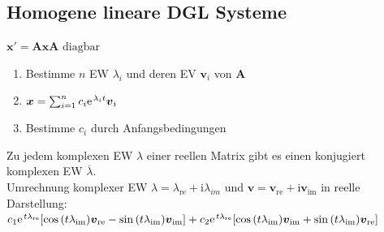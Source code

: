 \documentclass[6pt,a4paper]{scrartcl}
\let\olddot = \dot
\newcommand{\mat}[1]{\ensuremath{\begin{bmatrix} #1 \end{bmatrix}}}								%
\newcommand{\ma}[1]{\ensuremath{\boldsymbol {#1}}}												%
\newcommand{\vect}[1]{\ensuremath{\begin{pmatrix} #1 \end{pmatrix}}}							%
\newcommand{\svdots}{\ensuremath{\olddot :}}													%
\renewcommand{\vec}[1]{\ensuremath{\boldsymbol {#1}}}											%
\renewcommand*{\dot}[1]{\accentset{\mbox{\textrm{\large\bfseries .}} }{#1}}						%
\newcommand{\ol}[1]{\ensuremath{\overline{#1}}}									%
\newcommand{\ra}[0]{\ensuremath{\rightarrow}} 									%
\renewcommand{\i}{\ensuremath{\mathrm{i}}}										%
\newcommand{\R}{\ensuremath{\mathbb R}}
\begin{document}
\begin{multicols*}{4}
\subsection{Homogene lineare DGL Systeme}




$\boxed{\vec x'= \ma A\vec x}$\qquad$\ma A \text{ diagbar}$
\begin{enumerate}
	\item Bestimme $n$ EW $\lambda_i$ und deren EV $\vec v_i$ von $\ma A$
	\item $\vec x = \sum_{i=1}^n c_i\e^{\lambda_it}\vec v_i$
	\item Bestimme $c_i$ durch Anfangsbedingungen
	
\end{enumerate}
Zu jedem komplexen EW $\lambda$ einer reellen Matrix gibt es einen konjugiert komplexen EW $\ol \lambda$.\\
Umrechnung komplexer EW $\lambda = \lambda_{\text{re}}+ \i \lambda_{im}$ und $\vec v = \vec v_{\text{re}} + \i \vec v_{\text{im}}$ in reelle Darstellung: \\
$c_1 \e^{t\lambda_{\text{re}}}[\cos{(t\lambda_{\text{im}})}\vec v_{\text{re}} - \sin{(t\lambda_{\text{im}})}\vec v_{\text{im}}]+c_2\e^{t\lambda_{\text{re}}}[\cos{(t\lambda_{\text{im}})}\vec v_{\text{im}}+\sin{(t\lambda_{\text{im}})}\vec v_{\text{re}}]$


\end{multicols*}
\end{document}
